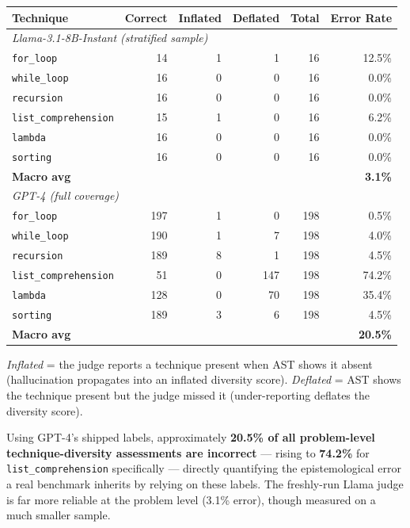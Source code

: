 \documentclass{article}
\begin{document}
\begin{center}
\begin{tabular}{lrrrrr}
\toprule
\textbf{Technique} & \textbf{Correct} & \textbf{Inflated} & \textbf{Deflated} & \textbf{Total} & \textbf{Error Rate} \\
\midrule
\multicolumn{6}{l}{\emph{Llama-3.1-8B-Instant (stratified sample)}} \\
\texttt{for\_loop}           & 14 & 1 & 1 & 16 & 12.5\% \\
\texttt{while\_loop}         & 16 & 0 & 0 & 16 & 0.0\%  \\
\texttt{recursion}           & 16 & 0 & 0 & 16 & 0.0\%  \\
\texttt{list\_comprehension} & 15 & 1 & 0 & 16 & 6.2\%  \\
\texttt{lambda}              & 16 & 0 & 0 & 16 & 0.0\%  \\
\texttt{sorting}             & 16 & 0 & 0 & 16 & 0.0\%  \\
\textbf{Macro avg} & & & & & \textbf{3.1\%} \\
\midrule
\multicolumn{6}{l}{\emph{GPT-4 (full coverage)}} \\
\texttt{for\_loop}           & 197 & 1 & 0   & 198 & 0.5\%  \\
\texttt{while\_loop}         & 190 & 1 & 7   & 198 & 4.0\%  \\
\texttt{recursion}           & 189 & 8 & 1   & 198 & 4.5\%  \\
\texttt{list\_comprehension} & 51  & 0 & 147 & 198 & 74.2\% \\
\texttt{lambda}              & 128 & 0 & 70  & 198 & 35.4\% \\
\texttt{sorting}             & 189 & 3 & 6   & 198 & 4.5\%  \\
\textbf{Macro avg} & & & & & \textbf{20.5\%} \\
\bottomrule
\end{tabular}
\end{center}

\emph{Inflated} = the judge reports a technique present when AST shows it
absent (hallucination propagates into an inflated diversity score).
\emph{Deflated} = AST shows the technique present but the judge missed it
(under-reporting deflates the diversity score).

Using GPT-4's shipped labels, approximately \textbf{20.5\% of all
problem-level technique-diversity assessments are incorrect} --- rising to
\textbf{74.2\%} for \texttt{list\_comprehension} specifically --- directly
quantifying the epistemological error a real benchmark inherits by relying on
these labels. The freshly-run Llama judge is far more reliable at the
problem level (3.1\% error), though measured on a much smaller sample.
\end{document}

